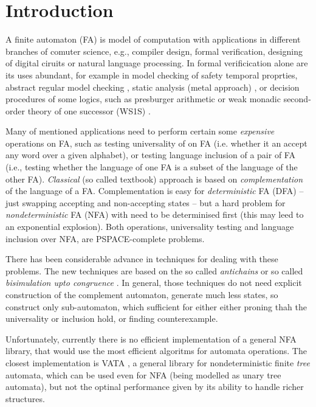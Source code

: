 \chapter{Introduction}
\label{introduction}
A finite automaton (FA) is model of computation with applications in different branches of comuter science, e.g., compiler design, formal verification, 
designing of digital ciruits or natural language processing. In formal verificication alone are its uses abundant, 
for example in model checking of safety temporal proprties, abstract regular model checking \cite{armc}, static analysis (metal approach) \cite{metal}, 
or decision procedures of some logics, such as presburger arithmetic or weak 
monadic second-order theory of one successor (WS1S) \cite{mona}.

Many of mentioned applications need to perform certain some \emph{expensive} operations on FA, such as testing universality of on FA (i.e. whether it an
accept any word over a given alphabet), or testing language inclusion of a pair of FA (i.e., testing whether the language of one FA is a subset of the language
of the other FA). \emph{Classical} (so called textbook) approach is based on \emph{complementation} of the language of a FA. Complementation is easy for 
\emph{deterministic} FA (DFA) -- just swapping accepting and non-accepting states -- but a hard problem for \emph{nondeterministic} FA (NFA) with need 
to be determinised first (this may leed to an exponential explosion). Both operations, universality testing and language inclusion over NFA, are PSPACE-complete
problems.

There has been considerable advance in techniques for dealing with these problems. The new techniques are based on the so called \emph{antichains} \cite{antichain}
\cite{congr} or so called \emph{bisimulation upto congruence} \cite{congr}. In general, those techniques do not need explicit construction of the complement
automaton, generate much less states, so construct only sub-automaton, which sufficient for either either proning thah the universality or inclusion hold, or
finding counterexample.

Unfortunately, currently there is no efficient implementation of a general NFA library, that would use the most efficient algoritms for automata operations. The
closest implementation is VATA \cite{libvata}, a general library for nondeterministic finite \emph{tree} automata, which can be used even for NFA (being modelled 
as unary tree automata), but not the optinal performance given by its ability to handle richer structures.
 
